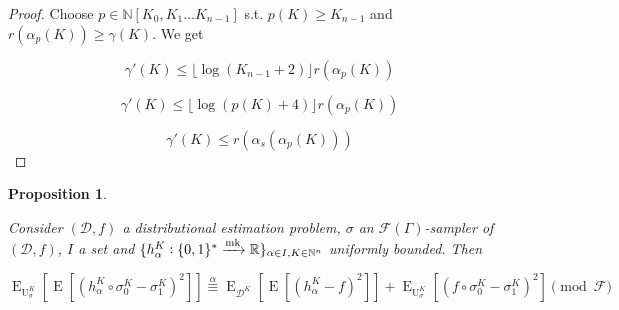 \documentclass[11pt]{article}
\numberwithin{equation}{section}
\theoremstyle{definition}
\theoremstyle{plain}
\newtheorem{proposition}{Proposition}[section]
\newcommand{\Bool}{\{0,1\}}
\newcommand{\Words}{{\Bool^*}}
\DeclareMathOperator{\E}{E}
\DeclareMathOperator{\Un}{U}
\newcommand{\Nats}{\mathbb{N}}
\newcommand{\Reals}{\mathbb{R}}
\newcommand{\NatPoly}{\Nats[K_0, K_1 \ldots K_{n-1}]}
\newcommand{\Floor}[1]{\lfloor #1 \rfloor}
\newcommand{\Dist}{\mathcal{D}}
\newcommand{\Fall}{\mathcal{F}}
\newcommand{\EG}{\Fall(\Gamma)}
\newcommand{\Markov}{\xrightarrow{\textnormal{mk}}}
\begin{document}
\begin{proof}

Choose ${p \in \NatPoly}$ s.t. ${p(K) \geq K_{n-1}}$ and ${r(\alpha_p(K)) \geq \gamma(K)}$. We get 

\[\gamma'(K) \leq \Floor{\log(K_{n-1}+2)} r(\alpha_p(K))\]

\[\gamma'(K) \leq \Floor{\log(p(K)+4)} r(\alpha_p(K))\]

\[\gamma'(K) \leq r(\alpha_s(\alpha_p(K)))\]
%
\end{proof}

\begin{samepage}
\begin{proposition}
\label{prp:est_err_smp}

Consider ${(\Dist,f)}$ a distributional estimation problem, ${\sigma}$ an ${\EG}$-sampler of ${(\Dist,f)}$, ${I}$ a set and ${\{h_\alpha^K: \Words \Markov \Reals\}_{\alpha \in I, K \in \Nats^n}}$ uniformly bounded. Then

\begin{equation}
\label{eqn:prp__est_err_smp}
\E_{\Un_\sigma^K}[\E[(h_\alpha^K \circ \sigma^K_0-\sigma^K_1)^2]] \overset{\alpha}{\equiv} \E_{\Dist^K}[\E[(h_\alpha^K-f)^2]] + \E_{\Un_\sigma^K}[(f \circ \sigma^K_0-\sigma^K_1)^2] \pmod \Fall
\end{equation}

\end{proposition}
\end{samepage}
\end{document}
